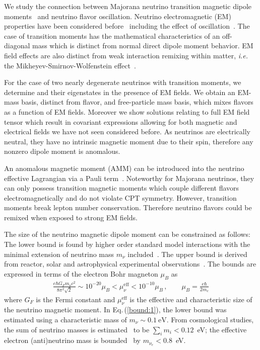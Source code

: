 \documentclass{ws-ijmpa}
\newcommand{\req}[1]{Eq.\,(\ref{#1})}
\begin{document}
We study the connection between Majorana neutrino transition magnetic dipole moments~\cite{Fujikawa:1980yx,Shrock:1980vy,Shrock:1982sc} and neutrino flavor oscillation. Neutrino electromagnetic (EM) properties have been considered before~\cite{Schechter:1981hw,Giunti:2014ixa,Chukhnova:2019oum,Popov:2019nkr} including the effect of oscillation~\cite{Pal:1991pm,Elizalde:2004mw}. The case of transition moments has the mathematical characteristics of an off-diagonal mass which is distinct from normal direct dipole moment behavior. EM field effects are also distinct from weak interaction remixing within matter, {\it i.e.\/} the Mikheyev-Smirnov-Wolfenstein effect~\cite{Wolfenstein:1977ue,Mikheyev:1985zog,Smirnov:2003da}.

For the case of two nearly degenerate neutrinos with transition moments, we determine and their eigenstates in the presence of EM fields. We obtain an EM-mass basis, distinct from flavor, and free-particle mass basis, which mixes flavors as a function of EM fields. Moreover we show solutions relating to full EM field tensor which result in covariant expressions allowing for both magnetic and electrical fields we have not seen considered before. As neutrinos are electrically neutral, they have no intrinsic magnetic moment due to their spin, therefore any nonzero dipole moment is anomalous.

An anomalous magnetic moment (AMM) can be introduced into the neutrino effective Lagrangian via a Pauli term~\cite{Steinmetz:2018ryf,Itzykson:1980rh,Schwartz:2014sze}. Noteworthy for Majorana neutrinos, they can only possess transition magnetic moments which couple different flavors electromagnetically and do not violate CPT symmetry. However, transition moments break lepton number conservation. Therefore neutrino flavors could be remixed when exposed to strong EM fields.

The size of the neutrino magnetic dipole moment can be constrained as follows: The lower bound is found by higher order standard model interactions with the minimal extension of neutrino mass $m_{\nu}$ included~\cite{Fujikawa:1980yx,Shrock:1980vy,Shrock:1982sc}. The upper bound is derived from reactor, solar and astrophysical experimental observations~\cite{Giunti:2015gga,Canas:2015yoa,Studenikin:2016ykv,AristizabalSierra:2021fuc}. The bounds are expressed in terms of the electron Bohr magneton $\mu_{B}$ as
\begin{align}
\label{bound:1}
\frac{e\hbar G_{F}m_{\nu}c^{2}}{8\pi^{2}\sqrt{2}} \sim 10^{-20}\mu_{B}<\mu_{\nu}^\mathrm{eff}<10^{-10}\mu_{B}\,,\qquad\mu_{B}=\frac{e\hbar}{2m_{e}}
\end{align}
where $G_{F}$ is the Fermi constant and $\mu_{\nu}^\mathrm{eff}$ is the effective and characteristic size of the neutrino magnetic moment. In \req{bound:1}, the lower bound was estimated using a characteristic mass of $m_{\nu}\sim0.1~\mathrm{eV}$. From cosmological studies, the sum of neutrino masses is estimated~\cite{Planck:2018vyg} to be $\sum_{i}m_{i}<0.12$~eV; the effective electron (anti)neutrino mass is bounded~\cite{KATRIN:2021uub} by $m_{\nu_{e}}<0.8$~eV.
\end{document}
